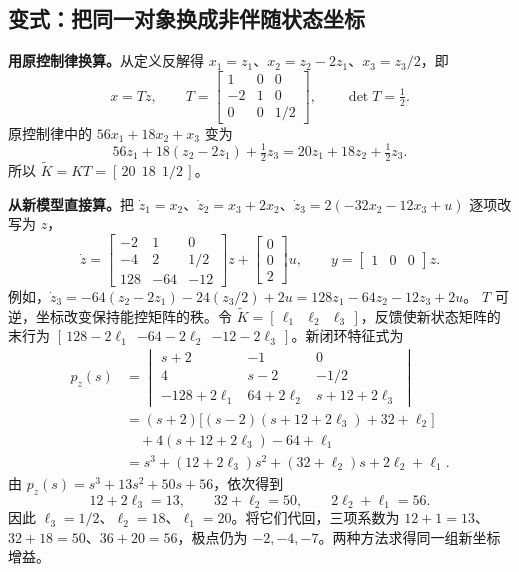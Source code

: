 \subsection{变式：把同一对象换成非伴随状态坐标}



\sol \textbf{用原控制律换算。}从定义反解得
$x_1=z_1$、$x_2=z_2-2z_1$、$x_3=z_3/2$，即
\[
    x=Tz,\qquad
    T=\begin{bmatrix}1&0&0\\-2&1&0\\0&0&1/2\end{bmatrix},\qquad
    \det T=\tfrac12.
\]
原控制律中的 $56x_1+18x_2+x_3$ 变为
\[
    56z_1+18(z_2-2z_1)+\tfrac12 z_3
    =20z_1+18z_2+\tfrac12 z_3 .
\]
所以 $\widetilde K=KT=[\,20\ \ 18\ \ 1/2\,]$。

\textbf{从新模型直接算。}把 $\dot z_1=x_2$、$\dot z_2=x_3+2x_2$、$\dot z_3=2(-32x_2-12x_3+u)$ 逐项改写为 $z$，
\[
    \dot z=
    \begin{bmatrix}
        -2&1&0\\-4&2&1/2\\128&-64&-12
    \end{bmatrix}z+
    \begin{bmatrix}0\\0\\2\end{bmatrix}u,\qquad
    y=\begin{bmatrix}1&0&0\end{bmatrix}z.
\]
例如，$\dot z_3=-64(z_2-2z_1)-24(z_3/2)+2u=128z_1-64z_2-12z_3+2u$。
$T$ 可逆，坐标改变保持能控矩阵的秩。令 $\widetilde K=[\,\ell_1\ \ \ell_2\ \ \ell_3\,]$，反馈使新状态矩阵的末行为 $[\,128-2\ell_1\ \ {-64-2\ell_2}\ \ {-12-2\ell_3}\,]$。新闭环特征式为
\[
\begin{aligned}
    p_z(s)
     &=\begin{vmatrix}
         s+2&-1&0\\
         4&s-2&-1/2\\
         -128+2\ell_1&64+2\ell_2&s+12+2\ell_3
       \end{vmatrix}\\
     &=(s+2)\bigl[(s-2)(s+12+2\ell_3)+32+\ell_2\bigr]\\
     &\quad +4(s+12+2\ell_3)-64+\ell_1\\
     &=s^3+(12+2\ell_3)s^2+(32+\ell_2)s+2\ell_2+\ell_1 .
\end{aligned}
\]
由 $p_z(s)=s^3+13s^2+50s+56$，依次得到
\[
    12+2\ell_3=13,\qquad
    32+\ell_2=50,\qquad
    2\ell_2+\ell_1=56.
\]
因此 $\ell_3=1/2$、$\ell_2=18$、$\ell_1=20$。将它们代回，三项系数为 $12+1=13$、$32+18=50$、$36+20=56$，极点仍为 $-2,-4,-7$。两种方法求得同一组新坐标增益。
